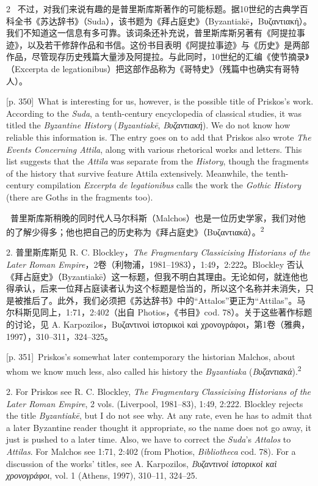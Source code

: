 \documentclass[10pt,a4paper]{article}
\begin{document}
\begin{paracol}{2}
\switchcolumn*
{\scriptsize\color{gray}[p. 350]}\ 不过，对我们来说有趣的是普里斯库斯著作的可能标题。据10世纪的古典学百科全书《苏达辞书》（Suda），该书题为《拜占庭史》（Byzantiakē，Βυζαντιακή）。我们不知道这一信息有多可靠。该词条还补充说，普里斯库斯另著有《阿提拉事迹》，以及若干修辞作品和书信。这份书目表明《阿提拉事迹》与《历史》是两部作品，尽管现存历史残篇大量涉及阿提拉。与此同时，10世纪的汇编《使节摘录》（Excerpta de legationibus）把这部作品称为《哥特史》（残篇中也确实有哥特人）。\par
\switchcolumn
{\scriptsize\color{gray}[p. 350]}\ What is interesting for us, however, is the possible title of Priskos’s work. According to the \textit{Suda}, a tenth-century encyclopedia of classical studies, it was titled the \textit{Byzantine History} (\textit{Byzantiakē}, \textit{Βυζαντιακή}). We do not know how reliable this information is. The entry goes on to add that Priskos also wrote \textit{The Events Concerning Attila}, along with various rhetorical works and letters. This list suggests that the \textit{Attila} was separate from the \textit{History}, though the fragments of the history that survive feature Attila extensively. Meanwhile, the tenth-century compilation \textit{Excerpta de legationibus} calls the work the \textit{Gothic History} (there are Goths in the fragments too).\par
\switchcolumn*
{\scriptsize\color{gray}[p. 351]}\ 普里斯库斯稍晚的同时代人马尔科斯（Malchos）也是一位历史学家，我们对他的了解少得多；他也把自己的历史称为《拜占庭史》（Βυζαντιακά）。\nobreak\textsuperscript{2}\par{\small 2. 普里斯库斯见 R. C. Blockley，\textit{The Fragmentary Classicising Historians of the Later Roman Empire}，2卷（利物浦，1981–1983），1:49，2:222。Blockley 否认《拜占庭史》（Byzantiakē）这一标题，但我不明白其理由。无论如何，就连他也得承认，后来一位拜占庭读者认为这个标题是恰当的，所以这个名称并未消失，只是被推后了。此外，我们必须把《苏达辞书》中的“Attalos”更正为“Attilas”。马尔科斯见同上，1:71，2:402（出自 Photios，《书目》cod. 78）。关于这些著作标题的讨论，见 A. Karpozilos，Βυζαντινοὶ ἱστορικοὶ καὶ χρονογράφοι，第1卷（雅典，1997），310–311，324–325。\par}
\switchcolumn
{\scriptsize\color{gray}[p. 351]}\ Priskos’s somewhat later contemporary the historian Malchos, about whom we know much less, also called his history the \textit{Byzantiaka }(\textit{Βυζαντιακά}).\nobreak\textsuperscript{2}\par{\small 2.  For Priskos see R. C. Blockley,\textit{ The Fragmentary Classicising Historians of the Later Roman Empire}, 2 vols. (Liverpool, 1981–83), 1:49, 2:222. Blockley rejects the title \textit{Byzantiakē}, but I do not see why. At any rate, even he has to admit that a later Byzantine reader thought it appropriate, so the name does not go away, it just is pushed to a later time. Also, we have to correct the \textit{Suda}’s \textit{Attalos} to \textit{Attilas}. For Malchos see 1:71, 2:402 (from Photios, \textit{Bibliotheca} cod. 78). For a discussion of the works’ titles, see A. Karpozilos, \textit{Βυζαντινοὶ ἱστορικοὶ καὶ χρονογράφοι}, vol. 1 (Athens, 1997), 310–11, 324–25.\par}

\end{paracol}
\end{document}
